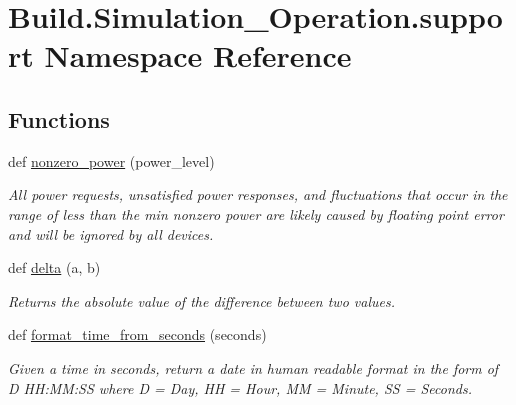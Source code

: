\hypertarget{namespace_build_1_1_simulation___operation_1_1support}{}\section{Build.\+Simulation\+\_\+\+Operation.\+support Namespace Reference}
\label{namespace_build_1_1_simulation___operation_1_1support}
\subsection*{Functions}
\begin{DoxyCompactItemize}
\item 
def \hyperlink{namespace_build_1_1_simulation___operation_1_1support_acca6fabc27b4396b056093d586ca08b3}{nonzero\+\_\+power} (power\+\_\+level)
\begin{DoxyCompactList}\small\item\em All power requests, unsatisfied power responses, and fluctuations that occur in the range of less than the min nonzero power are likely caused by floating point error and will be ignored by all devices. \end{DoxyCompactList}\item 
\mbox{\label{namespace_build_1_1_simulation___operation_1_1support_aff63e620df123c8bfaf59153da574355}} 
def \hyperlink{namespace_build_1_1_simulation___operation_1_1support_aff63e620df123c8bfaf59153da574355}{delta} (a, b)
\begin{DoxyCompactList}\small\item\em Returns the absolute value of the difference between two values. \end{DoxyCompactList}\item 
def \hyperlink{namespace_build_1_1_simulation___operation_1_1support_a93141935e1ce265eda8e45c1909ec65c}{format\+\_\+time\+\_\+from\+\_\+seconds} (seconds)
\begin{DoxyCompactList}\small\item\em Given a time in seconds, return a date in human readable format in the form of D H\+H\+:\+MM\+:SS where D = Day, HH = Hour, MM = Minute, SS = Seconds. \end{DoxyCompactList}\end{DoxyCompactItemize}
